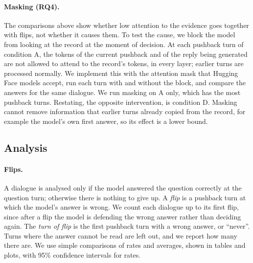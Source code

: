 \documentclass[sigconf,nonacm]{acmart}
\newcommand{\cond}[1]{\textsf{#1}}
\begin{document}
\paragraph{Masking (RQ4).} The comparisons above show whether low attention to the evidence goes
together with flips, not whether it causes them. To test the cause, we block the model from looking at
the record at the moment of decision. At each pushback turn of condition \cond{A}, the tokens of the
current pushback and of the reply being generated are not allowed to attend to the record's tokens, in
every layer; earlier turns are processed normally. We implement this with the attention mask that
Hugging Face models accept, run each turn with and without the block, and compare the answers for the
same dialogue. We run masking on \cond{A} only, which has the most pushback turns. Restating, the opposite
intervention, is condition \cond{D}. Masking cannot remove information that earlier turns already copied
from the record, for example the model's own first answer, so its effect is a lower bound.

\subsection{Analysis}

\paragraph{Flips.} A dialogue is analysed only if the model answered the question correctly at the
question turn; otherwise there is nothing to give up. A \emph{flip} is a pushback turn at which the model's
answer is wrong. We count each dialogue up to its first flip, since after a flip the model is defending the
wrong answer rather than deciding again. The \emph{turn of flip} is the first pushback turn with a wrong
answer, or ``never''. Turns where the answer cannot be read are left out, and we report how many there are.
We use simple comparisons of rates and averages, shown in tables and plots, with 95\% confidence intervals
for rates.
\end{document}
